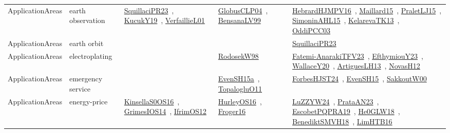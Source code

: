 {\begin{longtable}{lp{3cm}>{\raggedright\arraybackslash}p{6cm}>{\raggedright\arraybackslash}p{6cm}>{\raggedright\arraybackslash}p{8cm}}
\index{earth observation}\index{ApplicationAreas!earth observation}ApplicationAreas & earth observation & \href{../works/SquillaciPR23.pdf}{SquillaciPR23}~\cite{SquillaciPR23}, \href{../works/KucukY19.pdf}{KucukY19}~\cite{KucukY19}, \href{../works/VerfaillieL01.pdf}{VerfaillieL01}~\cite{VerfaillieL01} & \href{../works/GlobusCLP04.pdf}{GlobusCLP04}~\cite{GlobusCLP04}, \href{../works/BensanaLV99.pdf}{BensanaLV99}~\cite{BensanaLV99} & \href{../works/HebrardHJMPV16.pdf}{HebrardHJMPV16}~\cite{HebrardHJMPV16}, \href{../works/Maillard15.pdf}{Maillard15}~\cite{Maillard15}, \href{../works/PraletLJ15.pdf}{PraletLJ15}~\cite{PraletLJ15}, \href{../works/SimoninAHL15.pdf}{SimoninAHL15}~\cite{SimoninAHL15}, \href{../works/KelarevaTK13.pdf}{KelarevaTK13}~\cite{KelarevaTK13}, \href{../works/OddiPCC03.pdf}{OddiPCC03}~\cite{OddiPCC03}\\
\index{earth orbit}\index{ApplicationAreas!earth orbit}ApplicationAreas & earth orbit &  &  & \href{../works/SquillaciPR23.pdf}{SquillaciPR23}~\cite{SquillaciPR23}\\
\index{electroplating}\index{ApplicationAreas!electroplating}ApplicationAreas & electroplating &  & \href{../works/RodosekW98.pdf}{RodosekW98}~\cite{RodosekW98} & \href{../works/Fatemi-AnarakiTFV23.pdf}{Fatemi-AnarakiTFV23}~\cite{Fatemi-AnarakiTFV23}, \href{../works/EfthymiouY23.pdf}{EfthymiouY23}~\cite{EfthymiouY23}, \href{../works/WallaceY20.pdf}{WallaceY20}~\cite{WallaceY20}, \href{../works/ArtiguesLH13.pdf}{ArtiguesLH13}~\cite{ArtiguesLH13}, \href{../works/NovasH12.pdf}{NovasH12}~\cite{NovasH12}\\
\index{emergency service}\index{ApplicationAreas!emergency service}ApplicationAreas & emergency service &  & \href{../works/EvenSH15a.pdf}{EvenSH15a}~\cite{EvenSH15a}, \href{../works/TopalogluO11.pdf}{TopalogluO11}~\cite{TopalogluO11} & \href{../works/ForbesHJST24.pdf}{ForbesHJST24}~\cite{ForbesHJST24}, \href{../works/EvenSH15.pdf}{EvenSH15}~\cite{EvenSH15}, \href{../works/SakkoutW00.pdf}{SakkoutW00}~\cite{SakkoutW00}\\
\index{energy-price}\index{ApplicationAreas!energy-price}ApplicationAreas & energy-price & \href{../works/KinsellaS0OS16.pdf}{KinsellaS0OS16}~\cite{KinsellaS0OS16}, \href{../works/GrimesIOS14.pdf}{GrimesIOS14}~\cite{GrimesIOS14}, \href{../works/IfrimOS12.pdf}{IfrimOS12}~\cite{IfrimOS12} & \href{../works/HurleyOS16.pdf}{HurleyOS16}~\cite{HurleyOS16}, \href{../works/Froger16.pdf}{Froger16}~\cite{Froger16} & \href{../works/LuZZYW24.pdf}{LuZZYW24}~\cite{LuZZYW24}, \href{../works/PrataAN23.pdf}{PrataAN23}~\cite{PrataAN23}, \href{../works/EscobetPQPRA19.pdf}{EscobetPQPRA19}~\cite{EscobetPQPRA19}, \href{../works/He0GLW18.pdf}{He0GLW18}~\cite{He0GLW18}, \href{../works/BenediktSMVH18.pdf}{BenediktSMVH18}~\cite{BenediktSMVH18}, \href{../works/LimHTB16.pdf}{LimHTB16}~\cite{LimHTB16}\\

\end{longtable}}
